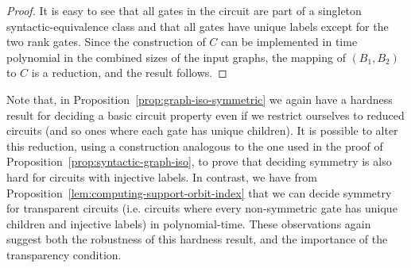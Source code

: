 \documentclass[../paper.tex]{subfiles}
\begin{document}
\begin{proof}






  It is easy to see that all gates in the circuit are part of a singleton
  syntactic-equivalence class and that all gates have unique labels except for
  the two rank gates. Since the construction of $C$ can be implemented in time
  polynomial in the combined sizes of the input graphs, the mapping of $(B_1,
  B_2)$ to $C$ is a reduction, and the result follows.
\end{proof}

Note that, in Proposition~\ref{prop:graph-iso-symmetric} we again have a
hardness result for deciding a basic circuit property even if we restrict
ourselves to reduced circuits (and so ones where each gate has unique children).
It is possible to alter this reduction, using a construction analogous to the
one used in the proof of Proposition~\ref{prop:syntactic-graph-iso}, to prove
that deciding symmetry is also hard for circuits with injective labels. In
contrast, we have from Proposition~\ref{lem:computing-support-orbit-index} that
we can decide symmetry for transparent circuits (i.e. circuits where every
non-symmetric gate has unique children and injective labels) in polynomial-time.
These observations again suggest both the robustness of this hardness result,
and the importance of the transparency condition.
\end{document}
